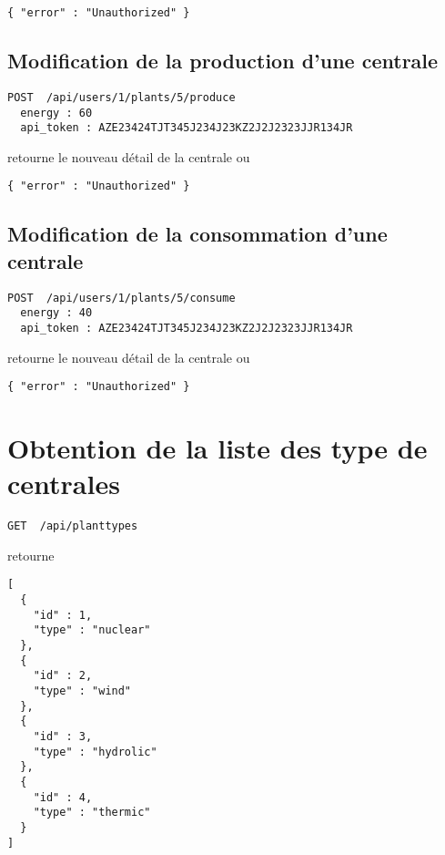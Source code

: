 \begin{lstlisting}
{ "error" : "Unauthorized" }
\end{lstlisting}

\subsection{Modification de la production d'une centrale}

\begin{lstlisting}
POST  /api/users/1/plants/5/produce
  energy : 60
  api_token : AZE23424TJT345J234J23KZ2J2J2323JJR134JR
\end{lstlisting}

retourne le nouveau détail de la centrale ou 

\begin{lstlisting}
{ "error" : "Unauthorized" }
\end{lstlisting}

\subsection{Modification de la consommation d'une centrale}

\begin{lstlisting}
POST  /api/users/1/plants/5/consume
  energy : 40
  api_token : AZE23424TJT345J234J23KZ2J2J2323JJR134JR
\end{lstlisting}

retourne le nouveau détail de la centrale ou 

\begin{lstlisting}
{ "error" : "Unauthorized" }
\end{lstlisting}

\section{Obtention de la liste des type de centrales}

\begin{lstlisting}
GET  /api/planttypes
\end{lstlisting}

retourne

\begin{lstlisting}
[
  {
    "id" : 1,
    "type" : "nuclear"
  },
  {
    "id" : 2,
    "type" : "wind"
  },
  {
    "id" : 3,
    "type" : "hydrolic"
  },
  {
    "id" : 4,
    "type" : "thermic"
  }
]
\end{lstlisting}



